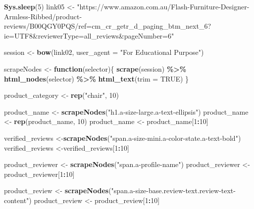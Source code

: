 \documentclass[
]{article}
\newenvironment{Shaded}{\begin{snugshade}}{\end{snugshade}}
\newcommand{\AttributeTok}[1]{\textcolor[rgb]{0.13,0.29,0.53}{#1}}
\newcommand{\ConstantTok}[1]{\textcolor[rgb]{0.56,0.35,0.01}{#1}}
\newcommand{\ControlFlowTok}[1]{\textcolor[rgb]{0.13,0.29,0.53}{\textbf{#1}}}
\newcommand{\DecValTok}[1]{\textcolor[rgb]{0.00,0.00,0.81}{#1}}
\newcommand{\FunctionTok}[1]{\textcolor[rgb]{0.13,0.29,0.53}{\textbf{#1}}}
\newcommand{\NormalTok}[1]{#1}
\newcommand{\OtherTok}[1]{\textcolor[rgb]{0.56,0.35,0.01}{#1}}
\newcommand{\SpecialCharTok}[1]{\textcolor[rgb]{0.81,0.36,0.00}{\textbf{#1}}}
\newcommand{\StringTok}[1]{\textcolor[rgb]{0.31,0.60,0.02}{#1}}
\begin{document}
\begin{Shaded}
\begin{Highlighting}[]
   \FunctionTok{Sys.sleep}\NormalTok{(}\DecValTok{5}\NormalTok{)}
\NormalTok{link05 }\OtherTok{\textless{}{-}} \StringTok{"https://www.amazon.com.au/Flash{-}Furniture{-}Designer{-}Armless{-}Ribbed/product{-}reviews/B00QGY0PQS/ref=cm\_cr\_getr\_d\_paging\_btm\_next\_6?ie=UTF8\&reviewerType=all\_reviews\&pageNumber=6"}


\NormalTok{  session }\OtherTok{\textless{}{-}} \FunctionTok{bow}\NormalTok{(link02,}
               \AttributeTok{user\_agent =} \StringTok{"For Educational Purpose"}\NormalTok{)}

\NormalTok{  scrapeNodes }\OtherTok{\textless{}{-}} \ControlFlowTok{function}\NormalTok{(selector)\{}
    \FunctionTok{scrape}\NormalTok{(session) }\SpecialCharTok{\%\textgreater{}\%}
      \FunctionTok{html\_nodes}\NormalTok{(selector) }\SpecialCharTok{\%\textgreater{}\%}
      \FunctionTok{html\_text}\NormalTok{(}\AttributeTok{trim =} \ConstantTok{TRUE}\NormalTok{)}
\NormalTok{  \}}

\NormalTok{  product\_category }\OtherTok{\textless{}{-}} \FunctionTok{rep}\NormalTok{(}\StringTok{"chair"}\NormalTok{, }\DecValTok{10}\NormalTok{)}

\NormalTok{  product\_name }\OtherTok{\textless{}{-}} \FunctionTok{scrapeNodes}\NormalTok{(}\StringTok{"h1.a{-}size{-}large.a{-}text{-}ellipsis"}\NormalTok{)}
\NormalTok{  product\_name }\OtherTok{\textless{}{-}} \FunctionTok{rep}\NormalTok{(product\_name, }\DecValTok{10}\NormalTok{)}
\NormalTok{  product\_name }\OtherTok{\textless{}{-}}\NormalTok{ product\_name[}\DecValTok{1}\SpecialCharTok{:}\DecValTok{10}\NormalTok{]}
  
\NormalTok{  verified\_reviews }\OtherTok{\textless{}{-}}\FunctionTok{scrapeNodes}\NormalTok{(}\StringTok{"span.a{-}size{-}mini.a{-}color{-}state.a{-}text{-}bold"}\NormalTok{)}
\NormalTok{  verified\_reviews }\OtherTok{\textless{}{-}}\NormalTok{verified\_reviews[}\DecValTok{1}\SpecialCharTok{:}\DecValTok{10}\NormalTok{]}
  
\NormalTok{  product\_reviewer }\OtherTok{\textless{}{-}} \FunctionTok{scrapeNodes}\NormalTok{(}\StringTok{"span.a{-}profile{-}name"}\NormalTok{)}
\NormalTok{  product\_reviewer }\OtherTok{\textless{}{-}}\NormalTok{ product\_reviewer[}\DecValTok{1}\SpecialCharTok{:}\DecValTok{10}\NormalTok{]}
  
\NormalTok{  product\_review }\OtherTok{\textless{}{-}} \FunctionTok{scrapeNodes}\NormalTok{(}\StringTok{"span.a{-}size{-}base.review{-}text.review{-}text{-}content"}\NormalTok{)}
\NormalTok{  product\_review }\OtherTok{\textless{}{-}}\NormalTok{ product\_review[}\DecValTok{1}\SpecialCharTok{:}\DecValTok{10}\NormalTok{]}
  

\end{Highlighting}
\end{Shaded}
\end{document}
